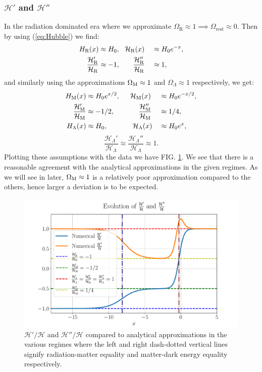 \documentclass[%
reprint,
 amsmath,amssymb,
 aps,
]{revtex4-2}
\newcommand{\Hp}{\mathcal{H}}
\begin{document}
\subsubsection{$\Hp'$ and $\Hp''$}
In the radiation dominated era where we approximate $\Omega_{\text{R}}\approx1\implies\Omega_\text{rest}\approx0$. Then by using (\ref{eq:Hubble}) we find:
\begin{alignat*}{2}
	H_{\text{R}}(x)&\approx H_0,~~\Hp_{\text{R}}(x)&&\approx H_0e^{-x},\\
	\frac{\Hp_{\text{R}}'}{\Hp_{\text{R}}}&\approx-1,\hspace{6.5mm}\frac{\Hp_{\text{R}}''}{\Hp_{\text{R}}}&&\approx1,
\end{alignat*}
and similarly using the approximations $\Omega_{\text M}\approx1$ and $\Omega_\Lambda\approx1$ respectively, we get:
\begin{alignat*}{2}
	H_\text{M}(x)&\approx H_0e^{x/2},\hspace{5mm}\Hp_\text M(x)&&\approx H_0e^{-x/2},\\
	\frac{\Hp_\text M'}{\Hp_\text M}&\approx-1/2,\hspace{12mm}\frac{\Hp_\text M''}{\Hp_\text M}&&\approx1/4,\\
	H_\Lambda(x)&\approx H_0,\hspace{12.5mm}\Hp_\Lambda(x)&&\approx H_0e^{x},
\end{alignat*}
\vspace{-7.2mm}
\[\frac{\Hp_\Lambda'}{\Hp_\Lambda}\approx\frac{\Hp_\Lambda''}{\Hp_\Lambda}\approx1.\]
Plotting these assumptions with the data we have FIG. \ref{fig:dHpddHp_vs_anal}. We see that there is a reasonable agreement with the analytical approximations in the given regimes. As we will see in later, $\Omega_{\text M}\approx1$ is a relatively poor approximation compared to the others, hence larger a deviation is to be expected.
\begin{figure}[ht!]
	\includegraphics[width = \linewidth]{Figures/dHpddHp_vs_anal.pdf}
	\caption{$\Hp'/\Hp$ and $\Hp''/\Hp$ compared to analytical approximations in the various regimes where the left and right dash-dotted vertical lines signify radiation-matter equality and matter-dark energy equality respectively.}
	\label{fig:dHpddHp_vs_anal}
\end{figure}
\end{document}
